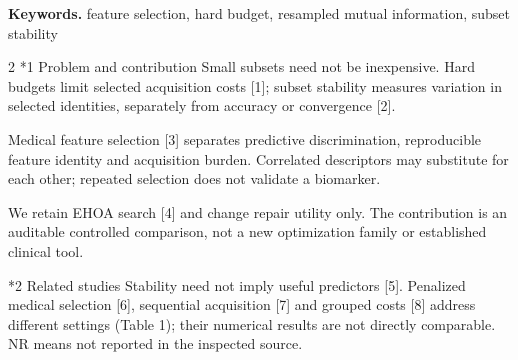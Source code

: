 \documentclass[10pt,a4paper]{article}
\makeatletter
\renewcommand{\section}{\@startsection{section}{1}{0pt}{5pt}{2pt}{\normalfont\normalsize\bfseries}}
\newcommand{\sect}[1]{\section*{#1}}
\makeatother
\begin{document}
\textbf{Keywords. } feature selection, hard budget, resampled mutual information, subset stability
\begin{multicols}{2}\raggedcolumns
\sect{1  Problem and contribution}
Small subsets need not be inexpensive. Hard budgets limit selected acquisition costs [1]; subset stability measures variation in selected identities, separately from accuracy or convergence [2].

Medical feature selection [3] separates predictive discrimination, reproducible feature identity and acquisition burden. Correlated descriptors may substitute for each other; repeated selection does not validate a biomarker.

We retain EHOA search [4] and change repair utility only. The contribution is an auditable controlled comparison, not a new optimization family or established clinical tool.

\sect{2  Related studies}
Stability need not imply useful predictors [5]. Penalized medical selection [6], sequential acquisition [7] and grouped costs [8] address different settings (Table 1); their numerical results are not directly comparable. NR means not reported in the inspected source.


\end{multicols}
\end{document}
